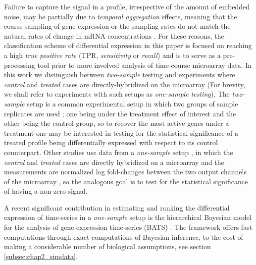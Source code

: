     Failure to capture the signal in a profile, irrespective of the amount of
    embedded noise, may be partially due to \textit{temporal aggregation}
    effects, meaning that the coarse sampling of gene expression or the sampling
    rates do not match the natural rates of change in mRNA concentrations
    \citep{bay2004temporal}. For these reasons, the classification
    scheme of differential expression in this paper is focused on reaching a high
    \textit{true positive rate} (TPR, \textit{sensitivity} or \textit{recall}) and
    is to serve as a pre-processing tool prior to more involved analysis of
    time-course microarray data. %
    In this work we distinguish between \textit{two-sample} testing and experiments
    where \textit{control} and \textit{treated} cases are directly-hybridized on the
    microarray (For brevity, we shall refer to experiments with such setups
    as \textit{one-sample testing}). The \textit{two-sample} setup is a common
    experimental setup in which two groups of sample replicates are used
    \citep{della2008direct, stegle2010robust}; one being under the treatment effect
    of interest and the other being the control group, so to recover the most active
    genes under a treatment one may be interested in testing for the statistical
    significance of a treated profile being differentially expressed with respect to
    its control counterpart. Other studies use data from a \textit{one-sample} setup
    \citep{angelini2007bayesian, angelini2008bats}, in which the \textit{control} and
    \textit{treated} cases are directly hybridized on a microarray and the
    measurements are normalized log fold-changes between the two output channels of
    the microarray \citep{schena1995quantitative}, so the analogous goal is to test
    for the statistical significance of having a non-zero signal.

    A recent significant contribution in estimating and ranking the differential
    expression of time-series in a \textit{one-sample} setup is the
    hierarchical Bayesian model for the analysis of gene expression time-series
    (BATS) \citep{angelini2007bayesian, angelini2008bats}. The framework offers fast
    computations through exact computations of Bayesian inference, to the cost of making a
    considerable number of biological assumptions, see section \ref{subsec:chap2_simdata}.

